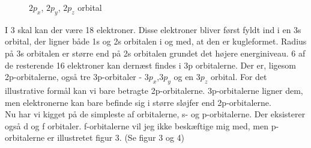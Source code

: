 \begin{figure}[ht!]
  \centering
  \caption{$2p_x$, $2p_y$, $2p_z$ orbital} \end{figure}

I 3 skal kan der være 18 elektroner. Disse elektroner bliver først fyldt ind i en 3s orbital, der ligner både 1s og 2s orbitalen i og med, at den er kugleformet. Radius på 3s orbitalen er større end på 2s orbitalen grundet det højere energiniveau. 6 af de resterende 16 elektroner kan dernæst findes i 3p orbitalerne. Der er, ligesom 2p-orbitalerne, også tre 3p-orbitaler - $3p_x$,$3p_y$ og en $3p_z$ orbital. For det illustrative formål kan vi bare betragte 2p-orbitalerne. 3p-orbitalerne ligner dem, men elektronerne kan bare befinde sig i større sløjfer end 2p-orbitalerne. 
\\
Nu har vi kigget på de simpleste af orbitalerne, s- og p-orbitalerne. Der eksisterer også d og f orbitaler. f-orbitalerne vil jeg ikke beskæftige mig med, men p-orbitalerne er illustretet  figur 3. (Se figur 3 og 4) 
\\

